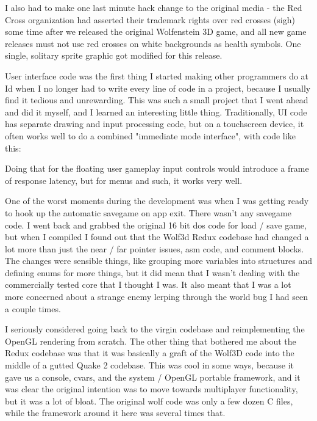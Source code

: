 I also had to make one last minute hack change to the original media - the Red Cross organization had asserted their trademark rights over red crosses (sigh) some time after we released the original Wolfenstein 3D game, and all new game releases must not use red crosses on white backgrounds as health symbols.  One single, solitary sprite graphic got modified for this release.\\
\par

User interface code was the first thing I started making other programmers do at Id when I no longer had to write every line of code in a project, because I usually find it tedious and unrewarding.  This was such a small project that I went ahead and did it myself, and I learned an interesting little thing.  Traditionally, UI code has separate drawing and input processing code, but on a touchscreen device, it often works well to do a combined "immediate mode interface", with code like this:\\
\par
\begin{minipage}{\textwidth}

\end{minipage}
\par
Doing that for the floating user gameplay input controls would introduce a frame of response latency, but for menus and such, it works very well.\\
\par

One of the worst moments during the development was when I was getting ready to hook up the automatic savegame on app exit.  There wasn't any savegame code.  I went back and grabbed the original 16 bit dos code for load / save game, but when I compiled I found out that the Wolf3d Redux codebase had changed a lot more than just the near / far pointer issues, asm code, and comment blocks.  The changes were sensible things, like grouping more variables into structures and defining enums for more things, but it did mean that I wasn't dealing with the commercially tested core that I thought I was.  It also meant that I was a lot more concerned about a strange enemy lerping through the world bug I had seen a couple times.\\
\par

I seriously considered going back to the virgin codebase and reimplementing the OpenGL rendering from scratch.  The other thing that bothered me about the Redux codebase was that it was basically a graft of the Wolf3D code into the middle of a gutted Quake 2 codebase.  This was cool in some ways, because it gave us a console, cvars, and the system / OpenGL portable framework, and it was clear the original intention was to move towards multiplayer functionality, but it was a lot of bloat.  The original wolf code was only a few dozen C files, while the framework around it here was several times that.\\
\par

